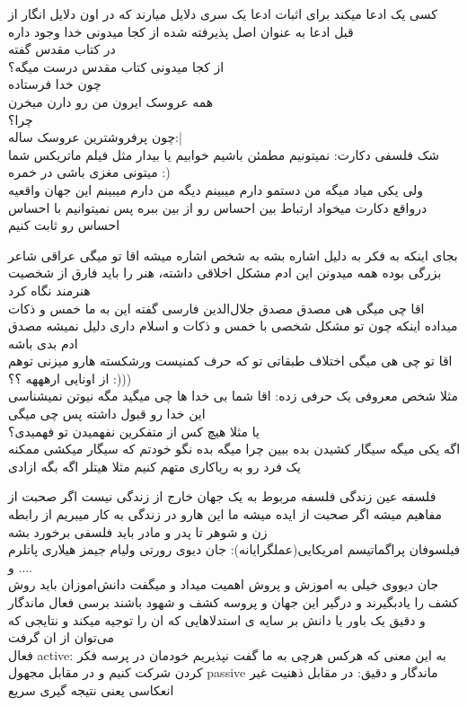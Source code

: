 \documentclass{article}
\begin{document}
	 کسی یک ادعا میکند برای اثبات ادعا یک سری دلایل میارند که در اون دلایل
	انگار از قبل ادعا به عنوان اصل پذیرفته شده 
	از کجا میدونی خدا وجود داره\\
	در کتاب مقدس گفته\\
	از کجا میدونی کتاب مقدس درست میگه؟\\
	چون خدا فرستاده\\
	همه عروسک ایرون من رو دارن میخرن\\
	چرا؟\\
	چون پرفروشترین عروسک ساله:|\\
	شک فلسفی دکارت: نمیتونیم مطمئن باشیم خوابیم یا بیدار مثل فیلم ماتریکس شما میتونی مغزی باشی در خمره :)\ \\
	ولی یکی میاد میگه من دستمو دارم میبینم دیگه من دارم میبینم این جهان واقعیه درواقع دکارت میخواد ارتباط بین احساس رو از بین ببره پس 
	نمیتوانیم با احساس احساس رو ثابت کنیم
	
	 بجای اینکه به فکر به دلیل اشاره بشه به شخص اشاره میشه
	 اقا تو میگی عراقی شاعر بزرگی بوده همه میدونن این ادم مشکل اخلاقی داشته، هنر را باید فارق از شخصیت هنرمند نگاه کرد\\
	اقا چی میگی هی مصدق مصدق جلال‌الدین فارسی گفته این به ما خمس و ذکات میداده اینکه چون تو مشکل شخصی با خمس و ذکات و اسلام داری دلیل 
	نمیشه مصدق ادم بدی باشه \\ اقا تو چی هی میگی اختلاف طبقاتی تو که حرف کمنیست ورشکسته هارو میزنی توهم از اونایی ارهههه ؟؟ :)))\\
	 مثلا شخص معروفی یک حرفی زده:‌ اقا شما بی خدا ها چی میگید مگه نیوتن نمیشناسی این خدا رو قبول داشته پس چی میگی\\
	یا مثلا هیچ کس از متفکرین نفهمیدن تو فهمیدی؟\\
	
	 اگه یکی میگه سیگار کشیدن بده ببین چرا میگه بده نگو خودتم که سیگار میکشی ممکنه یک فرد 
	رو به ریاکاری متهم کنیم مثلا هیتلر اگه بگه ازادی
	
	
	
	
	
		 فلسفه عین زندگی فلسفه مربوط به یک جهان خارج از زندگی نیست اگر صحبت از مفاهیم میشه اگر صحبت از ایده میشه ما 
		این هارو در زندگی به کار میبریم از رابطه زن و شوهر تا پدر و مادر باید فلسفی برخورد بشه\\
		فیلسوفان پراگماتیسم امریکایی(عملگرایانه): جان دیوی رورتی ولیام جیمز هیلاری پاتلرم و ....\\
		جان دیووی خیلی به اموزش و پروش اهمیت میداد و میگفت دانش‌اموزان باید روش کشف را یادبگیرند و درگیر این جهان و پروسه کشف و شهود باشند
		 برسی فعال ماندگار و دقیق یک باور یا دانش بر سایه ی استدلاهایی که ان را توجیه میکند
		و نتایجی که می‌توان از ان گرفت\\
			 فعال active: به این معنی که هرکس هرچی به ما گفت نپذیریم خودمان در پرسه فکر کردن شرکت کنیم و در مقابل مجهول passive
			 ماندگار و دقیق: در مقابل ذهنیت غیر انعکاسی یعنی نتیجه گیری سریع
		
\end{document}
